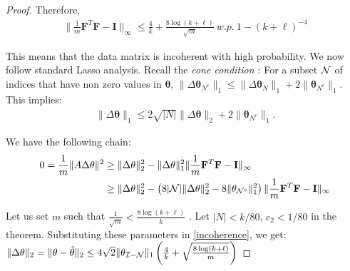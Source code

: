 \begin{proof}
Therefore,
\begin{align}
  \lVert 
  \frac{1}{m}\mathbf{F}^T  \mathbf{F} - \mathbf{I}\rVert_{\infty} \leq \frac{4}{k} + \frac{8 \log (k+\ell) }{\sqrt{m}} ~ w.p. ~ 1- (k+\ell)^{-4}
\end{align}

This means that the data matrix is incoherent with high probability. We now follow standard Lasso analysis. Recall the \textit{cone condition \cite{negahban2009unified}}: For a subset ${\cal N}$ of indices that have non zero values in $\mathbf{\theta}$, $ \lVert \Delta \mathbf{\theta}_{N^c} \rVert_1 \leq \lVert \Delta \mathbf{\theta}_{N} \rVert_1  + 2 \lVert \mathbf{\theta}_{N^c}  \rVert_1$. This implies:
\begin{align}\label{eq:cone}
\lVert \Delta \mathbf{\theta} \rVert_1 \leq 2 \sqrt{|N|} \lVert \Delta \mathbf{\theta} \rVert_2 + 2 \lVert \mathbf{\theta}_{N^c}  \rVert_1.
\end{align}

We have the following chain:
\begin{align}\label{incoherence}
0 = \frac{1}{m} \lVert A \Delta \mathbf{\theta} \rVert^2 & \geq  \lVert \Delta \mathbf{\theta} \rVert_2^2  -  \lVert \Delta \mathbf{\theta} \rVert_1^2 \lVert \frac{1}{m}\mathbf{F}^T  \mathbf{F} - \mathbf{I} \rVert_{\infty} \nonumber \\
\hfill & \geq \lVert \Delta \mathbf{\theta} \rVert_2^2  -  \left( 8 |{\cal N}| \lVert \Delta \mathbf{\theta} \rVert_2^2  - 8 \lVert  \mathbf{\theta}_{{\cal N}^c} \rVert_1^2 \right)\lVert \frac{1}{m}\mathbf{F}^T  \mathbf{F} - \mathbf{I} \rVert_{\infty}
\end{align}

Let us set $m$ such that $\frac{1}{\sqrt{m}} < \frac{8 \log(k+\ell)}{k}$
. Let $|N| < k/80$, $c_2 <1/80$ in the theorem. Substituting these parameters in \ref{incoherence}, we get:
$ \lVert \Delta \mathbf{\theta} \rVert_2  = \lVert \mathbf{\theta} - \hat{\mathbf{\theta}} \rVert_2 \leq 4\sqrt{2} \lVert \theta_{{\cal I}-{\cal N}} \rVert_1 \left( \frac{4}{k} +  \sqrt{\frac{8 \log(k+\ell)}{m}} \right)  $

\end{proof}